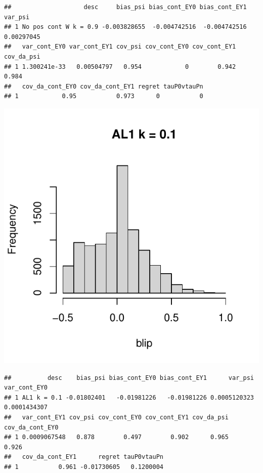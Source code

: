 \documentclass[11pt]{article}\usepackage[]{graphicx}\usepackage[table]{xcolor}
\makeatletter
\def\maxwidth{ %
  \ifdim\Gin@nat@width>\linewidth
    \linewidth
  \else
    \Gin@nat@width
  \fi
}
\newenvironment{kframe}{%
 \def\at@end@of@kframe{}%
 \ifinner\ifhmode%
  \def\at@end@of@kframe{\end{minipage}}%
  \begin{minipage}{\columnwidth}%
 \fi\fi%
 \def\FrameCommand##1{\hskip\@totalleftmargin \hskip-\fboxsep
 \colorbox{shadecolor}{##1}\hskip-\fboxsep
     \hskip-\linewidth \hskip-\@totalleftmargin \hskip\columnwidth}%
 \MakeFramed {\advance\hsize-\width
   \@totalleftmargin\z@ \linewidth\hsize
   \@setminipage}}%
 {\par\unskip\endMakeFramed%
 \at@end@of@kframe}
\newenvironment{knitrout}{}{} %
\makeatother
\begin{document}
\begin{knitrout}
\begin{kframe}\begin{verbatim}
##                    desc     bias_psi bias_cont_EY0 bias_cont_EY1    var_psi
## 1 No pos cont W k = 0.9 -0.003828655  -0.004742516  -0.004742516 0.00297045
##   var_cont_EY0 var_cont_EY1 cov_psi cov_cont_EY0 cov_cont_EY1 cov_da_psi
## 1 1.300241e-33   0.00504797   0.954            0        0.942      0.984
##   cov_da_cont_EY0 cov_da_cont_EY1 regret tauP0vtauPn
## 1            0.95           0.973      0           0
\end{verbatim}
\end{kframe}
\includegraphics[width=\maxwidth]{figure/unnamed-chunk-4-13} 
\begin{kframe}\begin{verbatim}
##          desc    bias_psi bias_cont_EY0 bias_cont_EY1      var_psi var_cont_EY0
## 1 AL1 k = 0.1 -0.01802401   -0.01981226   -0.01981226 0.0005120323 0.0001434307
##   var_cont_EY1 cov_psi cov_cont_EY0 cov_cont_EY1 cov_da_psi cov_da_cont_EY0
## 1 0.0009067548   0.878        0.497        0.902      0.965           0.926
##   cov_da_cont_EY1      regret tauP0vtauPn
## 1           0.961 -0.01730605   0.1200004
\end{verbatim}
\end{kframe}

\end{knitrout}
\end{document}
